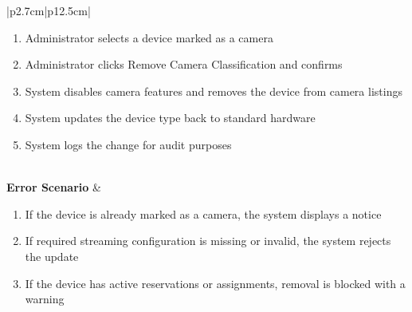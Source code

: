 \begin{table}[H]
\begin{tabular}{|p{2.7cm}|p{12.5cm}|}
\begin{minipage}[t]{\linewidth}
\begin{enumerate}[topsep=0pt,itemsep=1pt,parsep=0pt,partopsep=0pt]
                                            \item Administrator selects a device marked as a camera
                                            \item Administrator clicks Remove Camera Classification and confirms
                                            \item System disables camera features and removes the device from camera listings
                                            \item System updates the device type back to standard hardware
                                            \item System logs the change for audit purposes
                                        \end{enumerate}
                                    \end{minipage} \\
        \hline
        \textbf{Error Scenario} & \begin{minipage}[t]{\linewidth}
                                        \begin{enumerate}[topsep=0pt,itemsep=1pt,parsep=0pt,partopsep=0pt]
                                            \item If the device is already marked as a camera, the system displays a notice
                                            \item If required streaming configuration is missing or invalid, the system rejects the update
                                            \item If the device has active reservations or assignments, removal is blocked with a warning
                                        \end{enumerate}
                                    \end{minipage} \\
        \hline
    \end{tabular}
    \label{tab:admin-mark-remove-device-camera}
\end{table}

